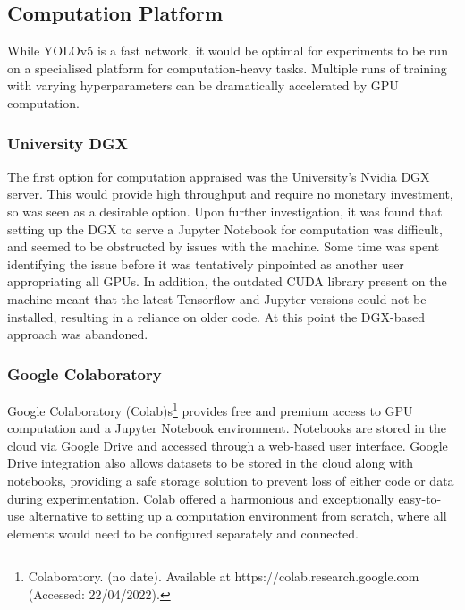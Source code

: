 
\subsection{Computation Platform}
While YOLOv5 is a fast network, it would be optimal for experiments to be run on a specialised platform for computation-heavy tasks. Multiple runs of training with varying hyperparameters can be dramatically accelerated by GPU computation.

\subsubsection{University DGX}
The first option for computation appraised was the University's Nvidia DGX server. This would provide high throughput and require no monetary investment, so was seen as a desirable option. Upon further investigation, it was found that setting up the DGX to serve a Jupyter Notebook for computation was difficult, and seemed to be obstructed by issues with the machine. Some time was spent identifying the issue before it was tentatively pinpointed as another user appropriating all GPUs. In addition, the outdated CUDA library present on the machine meant that the latest Tensorflow and Jupyter versions could not be installed, resulting in a reliance on older code. At this point the DGX-based approach was abandoned.

\subsubsection{Google Colaboratory}
Google Colaboratory (Colab)s\footnote{Colaboratory. (no date). Available at https://colab.research.google.com (Accessed: 22/04/2022).} provides free and premium access to GPU computation and a Jupyter Notebook environment. Notebooks are stored in the cloud via Google Drive and accessed through a web-based user interface. Google Drive integration also allows datasets to be stored in the cloud along with notebooks, providing a safe storage solution to prevent loss of either code or data during experimentation. Colab offered a harmonious and exceptionally easy-to-use alternative to setting up a computation environment from scratch, where all elements would need to be configured separately and connected.\\

